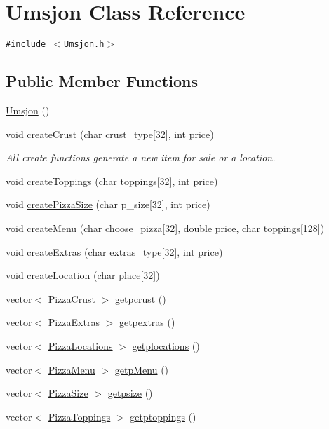 \hypertarget{class_umsjon}{
\section{Umsjon Class Reference}
\label{class_umsjon}
}
{\tt \#include $<$Umsjon.h$>$}

\subsection*{Public Member Functions}
\begin{CompactItemize}
\item 
\hyperlink{class_umsjon_1f89bef332176cd139fa5f900d4735b6}{Umsjon} ()
\item 
void \hyperlink{class_umsjon_75c9c243db5456ca368b8cdc6f617603}{create\-Crust} (char crust\_\-type\mbox{[}32\mbox{]}, int price)
\begin{CompactList}\small\item\em All create functions generate a new item for sale or a location. \item\end{CompactList}\item 
void \hyperlink{class_umsjon_b4c5d68540dc069a5871e57482a44454}{create\-Toppings} (char toppings\mbox{[}32\mbox{]}, int price)
\item 
void \hyperlink{class_umsjon_9b94d4f7ba3bbc2c46cc7bdce8f09d61}{create\-Pizza\-Size} (char p\_\-size\mbox{[}32\mbox{]}, int price)
\item 
void \hyperlink{class_umsjon_ce183afe9e7ad9a7492ac2241e2481e5}{create\-Menu} (char choose\_\-pizza\mbox{[}32\mbox{]}, double price, char toppings\mbox{[}128\mbox{]})
\item 
void \hyperlink{class_umsjon_b3b4384d1b6159cee7aab19dc1ff23eb}{create\-Extras} (char extras\_\-type\mbox{[}32\mbox{]}, int price)
\item 
void \hyperlink{class_umsjon_6827be731c8d50370297264676be442f}{create\-Location} (char place\mbox{[}32\mbox{]})
\item 
vector$<$ \hyperlink{class_pizza_crust}{Pizza\-Crust} $>$ \hyperlink{class_umsjon_1ba4091781dbf5acfd11d9bbd3c476c1}{getpcrust} ()
\item 
vector$<$ \hyperlink{class_pizza_extras}{Pizza\-Extras} $>$ \hyperlink{class_umsjon_48a5a2fa53cb3c40c681bd053598876b}{getpextras} ()
\item 
vector$<$ \hyperlink{class_pizza_locations}{Pizza\-Locations} $>$ \hyperlink{class_umsjon_a84f9abb849190a11dfcb3f0d5d619cc}{getplocations} ()
\item 
vector$<$ \hyperlink{class_pizza_menu}{Pizza\-Menu} $>$ \hyperlink{class_umsjon_729f51349769ff866a7cf5d79d381c2b}{getp\-Menu} ()
\item 
vector$<$ \hyperlink{class_pizza_size}{Pizza\-Size} $>$ \hyperlink{class_umsjon_fffa683bcf55b44d751ab146b21b3ae9}{getpsize} ()
\item 
vector$<$ \hyperlink{class_pizza_toppings}{Pizza\-Toppings} $>$ \hyperlink{class_umsjon_63e370dface20065bb6dde6d38ea4287}{getptoppings} ()
\end{CompactItemize}


